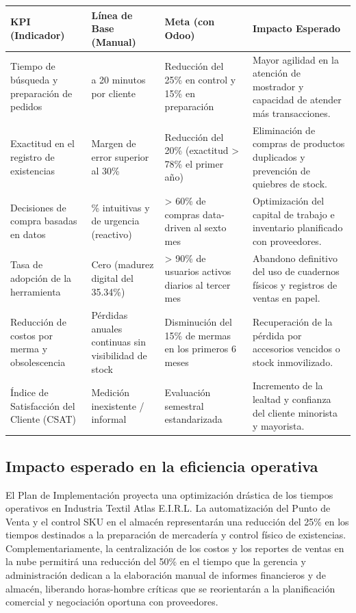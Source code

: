\renewcommand{\arraystretch}{1.4}
\begin{tabularx}{\textwidth}{|>{\raggedright\arraybackslash}p{3.2cm}|>{\raggedright\arraybackslash}p{2.8cm}|>{\raggedright\arraybackslash}p{2.8cm}|X|}
    \hline
    \textbf{KPI (Indicador)} & \textbf{Línea de Base (Manual)} & \textbf{Meta (con Odoo)} & \textbf{Impacto Esperado} \\ \hline
    Tiempo de búsqueda y preparación de pedidos & 15 a 20 minutos por cliente & Reducción del 25\% en control y 15\% en preparación & Mayor agilidad en la atención de mostrador y capacidad de atender más transacciones. \\ \hline
    Exactitud en el registro de existencias & Margen de error superior al 30\% & Reducción del 20\% (exactitud > 78\% el primer año) & Eliminación de compras de productos duplicados y prevención de quiebres de stock. \\ \hline
    Decisiones de compra basadas en datos & 100\% intuitivas y de urgencia (reactivo) & > 60\% de compras data-driven al sexto mes & Optimización del capital de trabajo e inventario planificado con proveedores. \\ \hline
    Tasa de adopción de la herramienta & Cero (madurez digital del 35.34\%) & > 90\% de usuarios activos diarios al tercer mes & Abandono definitivo del uso de cuadernos físicos y registros de ventas en papel. \\ \hline
    Reducción de costos por merma y obsolescencia & Pérdidas anuales continuas sin visibilidad de stock & Disminución del 15\% de mermas en los primeros 6 meses & Recuperación de la pérdida por accesorios vencidos o stock inmovilizado. \\ \hline
    Índice de Satisfacción del Cliente (CSAT) & Medición inexistente / informal & Evaluación semestral estandarizada & Incremento de la lealtad y confianza del cliente minorista y mayorista. \\ \hline
\end{tabularx}

\subsection{Impacto esperado en la eficiencia operativa}
\begin{indentedsubsection}
El Plan de Implementación proyecta una optimización drástica de los tiempos operativos en Industria Textil Atlas E.I.R.L. La automatización del Punto de Venta y el control SKU en el almacén representarán una reducción del 25\% en los tiempos destinados a la preparación de mercadería y control físico de existencias. Complementariamente, la centralización de los costos y los reportes de ventas en la nube permitirá una reducción del 50\% en el tiempo que la gerencia y administración dedican a la elaboración manual de informes financieros y de almacén, liberando horas-hombre críticas que se reorientarán a la planificación comercial y negociación oportuna con proveedores.
\end{indentedsubsection}

